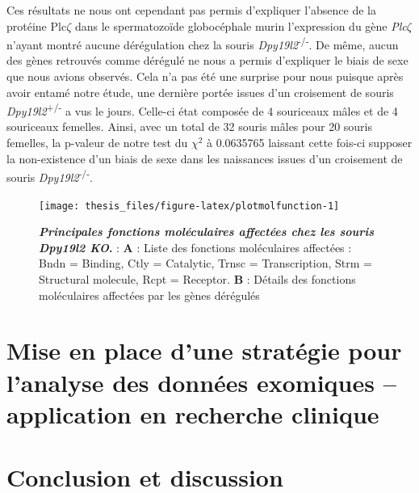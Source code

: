 \documentclass[12pt,twoside]{ugathesis}
\begin{document}
Ces résultats ne nous ont cependant pas permis d'expliquer l'absence de
la protéine Plc\(\zeta\) dans le spermatozoïde globocéphale murin
l'expression du gène \emph{Plc}\(\zeta\) n'ayant montré aucune
dérégulation chez la souris \emph{Dpy19l2}\textsuperscript{-/-}. De
même, aucun des gènes retrouvés comme dérégulé ne nous a permis
d'expliquer le biais de sexe que nous avions observés. Cela n'a pas été
une surprise pour nous puisque après avoir entamé notre étude, une
dernière portée issues d'un croisement de souris
\emph{Dpy19l2}\textsuperscript{+/-} a vus le jours. Celle-ci état
composée de 4 souriceaux mâles et de 4 souriceaux femelles. Ainsi, avec
un total de 32 souris mâles pour 20 souris femelles, la p-valeur de
notre test du \(\chi^2\) à 0.0635765 laissant cette fois-ci supposer la
non-existence d'un biais de sexe dans les naissances issues d'un
croisement de souris \emph{Dpy19l2}\textsuperscript{-/-}.

\newpage 

\begin{figure}

{\centering \texttt{[image: thesis\_files/figure-latex/plotmolfunction-1]} 

}

\caption[Principales fonctions moléculaires affectées chez les souris *Dpy19l2* KO]{\textbf{\emph{Principales fonctions moléculaires
affectées chez les souris \emph{Dpy19l2} KO}.} : \textbf{A} : Liste des
fonctions moléculaires affectées : Bndn = Binding, Ctly = Catalytic,
Trnsc = Transcription, Strm = Structural molecule, Rcpt = Receptor.
\textbf{B} : Détails des fonctions moléculaires affectées par les gènes
dérégulés}\label{fig:plotmolfunction}
\end{figure}








\chapter{Mise en place d'une stratégie pour l'analyse des données
exomiques -- application en recherche
clinique}\label{mise-en-place-dune-strategie-pour-lanalyse-des-donnees-exomiques-application-en-recherche-clinique}

\chapter*{Conclusion et discussion}\label{conclusion-et-discussion}
\end{document}
